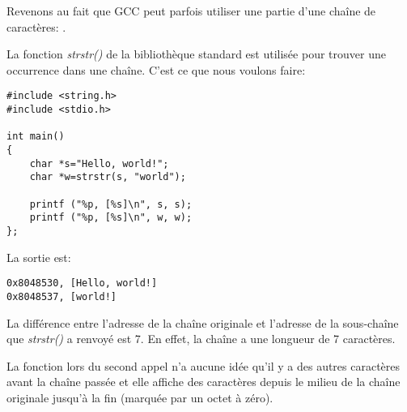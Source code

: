 \label{strstr_example}

Revenons au fait que GCC peut parfois utiliser une partie d'une chaîne de caractères:
.

La fonction \emph{strstr()} de la bibliothèque standard \CCpp est utilisée pour trouver
une occurrence dans une chaîne. C'est ce que nous voulons faire:

\begin{lstlisting}[style=customc]
#include <string.h>
#include <stdio.h>

int main()
{
	char *s="Hello, world!";
	char *w=strstr(s, "world");

	printf ("%p, [%s]\n", s, s);
	printf ("%p, [%s]\n", w, w);
};
\end{lstlisting}

La sortie est:

\begin{lstlisting}
0x8048530, [Hello, world!]
0x8048537, [world!]
\end{lstlisting}

La différence entre l'adresse de la chaîne originale et l'adresse de la sous-chaîne
que \emph{strstr()} a renvoyé est 7.
En effet, la chaîne  a une longueur de 7 caractères.

La fonction \printf{} lors du second appel n'a aucune idée qu'il y a des autres caractères
avant la chaîne passée et elle affiche des caractères depuis le milieu de la chaîne
originale jusqu'à la fin (marquée par un octet à zéro).

